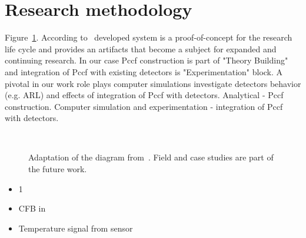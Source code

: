 \section{Research methodology}
Figure~\ref{fig:methodology}.
According to~\cite{nunamaker1990systems} developed system is a proof-of-concept for the research life cycle and provides an artifacts that become a subject for expanded and continuing research.
In our case Pccf construction is part of "Theory Building" and integration of Pccf with existing detectors is "Experimentation" block.
A pivotal in our work role plays computer simulations investigate detectors behavior (e.g. ARL) and effects of integration of Pccf with detectors.
Analytical - Pccf construction.
Computer simulation and experimentation - integration of Pccf with detectors.

\begin{figure}[htb!]
\centering

  \caption{Adaptation of the diagram from~\cite{nunamaker1990systems}. Field and case studies are part of the future work.}
  ~\label{fig:methodology}
\end{figure}

\begin{itemize}
  \item 1
  \item CFB in~\cite{x}
  \item Temperature signal from sensor
\end{itemize}

